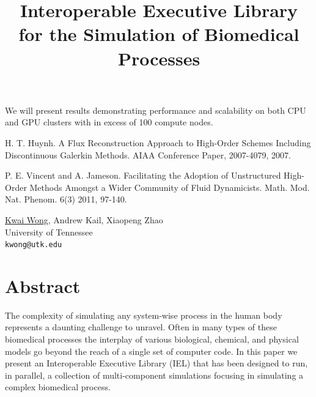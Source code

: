 \documentclass[article, A4, 11pt]{llncs}%
\begin{document}
We will present results demonstrating performance and scalability on both CPU and GPU clusters with in excess of 100 compute nodes.



\begin{thebibliography}{10}
{\sc H. T. Huynh}. {A Flux Reconstruction Approach to High-Order Schemes Including Discontinuous Galerkin Methods}. AIAA Conference Paper, 2007-4079, 2007.

{\sc P. E. Vincent and A. Jameson}. {Facilitating the Adoption of Unstructured High-Order Methods Amongst a Wider Community of Fluid Dynamicists}. Math. Mod. Nat. Phenom.  6(3) 2011, 97-140.
\end{thebibliography} %

\title{Interoperable Executive Library for the Simulation of Biomedical Processes}
 \author{} \institute{}
\maketitle
\begin{center}
{\large \underline{Kwai Wong}, Andrew Kail, Xiaopeng  Zhao}\\
University of Tennessee\\
{\tt kwong@utk.edu}
\end{center}

\section*{Abstract}
The complexity of simulating any system-wise process in the human body represents a daunting challenge to unravel. Often in many types of these biomedical processes the interplay of various biological, chemical, and physical models go beyond the reach of a single set of computer code. In this paper we present an Interoperable Executive Library (IEL) that has been designed to run, in parallel, a collection of multi-component simulations focusing in simulating a complex biomedical process. 
 
\end{document}
